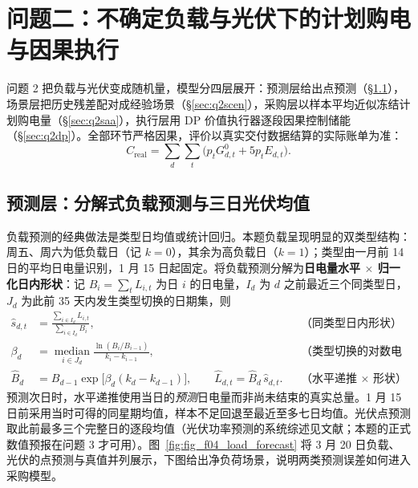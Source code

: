 \section{问题二：不确定负载与光伏下的计划购电与因果执行}
问题 2 把负载与光伏变成随机量，模型分四层展开：预测层给出点预测（\S\ref{sec:q2forecast}），场景层把历史残差配对成经验场景（\S\ref{sec:q2scen}），采购层以样本平均近似冻结计划购电量（\S\ref{sec:q2saa}），执行层用 DP 价值执行器逐段因果控制储能（\S\ref{sec:q2dp}）。全部环节严格因果，评价以真实交付数据结算的实际账单为准：
\begin{equation}
C_{\mathrm{real}}=\sum_{d}\sum_{t}\bigl(p_tG^0_{d,t}+5p_tE_{d,t}\bigr).
\label{eq:q2bill}
\end{equation}

\subsection{预测层：分解式负载预测与三日光伏均值}\label{sec:q2forecast}
负载预测的经典做法是类型日均值或统计回归\cite{kangcq,hong}。本题负载呈现明显的双类型结构：周五、周六为低负载日（记 $k=0$），其余为高负载日（$k=1$）；类型由一月前 14 日的平均日电量识别，1 月 15 日起固定。将负载预测分解为\textbf{日电量水平 $\times$ 归一化日内形状}：记 $B_i=\sum_tL_{i,t}$ 为日 $i$ 的日电量，$I_d$ 为 $d$ 之前最近三个同类型日，$J_d$ 为此前 35 天内发生类型切换的日期集，则
\begin{align}
\hat s_{d,t}&=\frac{\sum_{i\in I_d}L_{i,t}}{\sum_{i\in I_d}B_i}, &&\text{（同类型日内形状）}\label{eq:q2shape}\\
\beta_d&=\operatorname*{median}_{i\in J_d}\frac{\ln(B_i/B_{i-1})}{k_i-k_{i-1}}, &&\text{（类型切换的对数电量比率）}\label{eq:q2beta}\\
\hat B_d&=B_{d-1}\exp\bigl[\beta_d(k_d-k_{d-1})\bigr],\qquad
\hat L_{d,t}=\hat B_d\,\hat s_{d,t}. &&\text{（水平递推 $\times$ 形状）}\label{eq:q2load}
\end{align}
预测次日时，水平递推使用当日的\emph{预测}日电量而非尚未结束的真实总量。1 月 15 日前采用当时可得的同星期均值，样本不足回退至最近至多七日均值。光伏点预测取此前最多三个完整日的逐段均值（光伏功率预测的系统综述见文献\cite{antonanzas}；本题的正式数值预报在问题 3 才可用）。图~\ref{fig:fig_f04_load_forecast} 将 3 月 20 日负载、光伏的点预测与真值并列展示，下图给出净负荷场景，说明两类预测误差如何进入采购模型。



